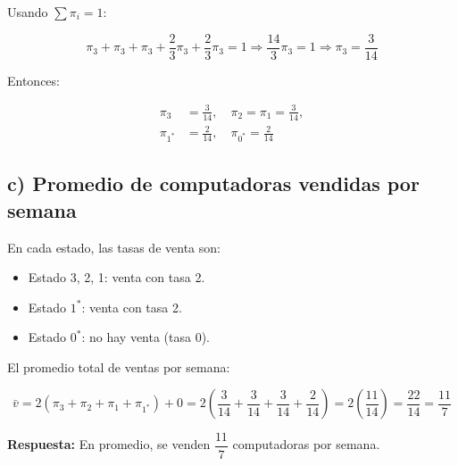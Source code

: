 \documentclass[10pt]{article}
\begin{document}
Usando $\sum \pi_i = 1$:

\begin{equation*}
\pi_3 + \pi_3 + \pi_3 + \frac{2}{3}\pi_3 + \frac{2}{3}\pi_3 = 1 \Rightarrow \frac{14}{3}\pi_3 = 1 \Rightarrow \pi_3 = \frac{3}{14}
\end{equation*}

Entonces:

\begin{equation*}
\begin{aligned}
\pi_3 &= \frac{3}{14}, \quad
\pi_2 = \pi_1 = \frac{3}{14}, \\
\pi_{1^*} &= \frac{2}{14}, \quad
\pi_{0^*} = \frac{2}{14}
\end{aligned}
\end{equation*}

\subsection*{c) Promedio de computadoras vendidas por semana}

En cada estado, las tasas de venta son:

\begin{itemize}
  \item Estado 3, 2, 1: venta con tasa 2.
  \item Estado $1^*$: venta con tasa 2.
  \item Estado $0^*$: no hay venta (tasa 0).
\end{itemize}

El promedio total de ventas por semana:

\begin{equation*}
\bar{v} = 2(\pi_3 + \pi_2 + \pi_1 + \pi_{1^*}) + 0 = 2\left(\frac{3}{14} + \frac{3}{14} + \frac{3}{14} + \frac{2}{14}\right) = 2\left(\frac{11}{14}\right) = \frac{22}{14} = \frac{11}{7}
\end{equation*}

\textbf{Respuesta:} En promedio, se venden $\boxed{\dfrac{11}{7}}$ computadoras por semana.
\end{document}
